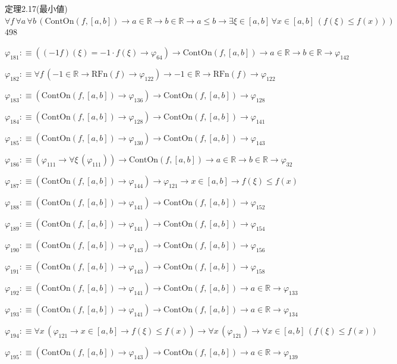 \begin{fullproof}{定理2.17(最小値)}{$\forall f\,\forall a\,\forall b\,(\mathrm{ContOn}(f,[a,b]) \to a \in \mathbb{R} \to b \in \mathbb{R} \to a \leq b \to \exists \xi \in [a,b]\,\forall x \in [a,b]\,(f(\xi) \leq f(x)))$}{498}
\begin{abbrevlist}
\item $\varphi_{181} :\equiv ((-1 f)(\xi) = -1 \cdot f(\xi) \to \varphi_{64}) \to \mathrm{ContOn}(f,[a,b]) \to a \in \mathbb{R} \to b \in \mathbb{R} \to \varphi_{142}$
\item $\varphi_{182} :\equiv \forall f\,(-1 \in \mathbb{R} \to \mathrm{RFn}(f) \to \varphi_{122}) \to -1 \in \mathbb{R} \to \mathrm{RFn}(f) \to \varphi_{122}$
\item $\varphi_{183} :\equiv (\mathrm{ContOn}(f,[a,b]) \to \varphi_{136}) \to \mathrm{ContOn}(f,[a,b]) \to \varphi_{128}$
\item $\varphi_{184} :\equiv (\mathrm{ContOn}(f,[a,b]) \to \varphi_{128}) \to \mathrm{ContOn}(f,[a,b]) \to \varphi_{141}$
\item $\varphi_{185} :\equiv (\mathrm{ContOn}(f,[a,b]) \to \varphi_{130}) \to \mathrm{ContOn}(f,[a,b]) \to \varphi_{143}$
\item $\varphi_{186} :\equiv (\varphi_{111} \to \forall \xi\,(\varphi_{111})) \to \mathrm{ContOn}(f,[a,b]) \to a \in \mathbb{R} \to b \in \mathbb{R} \to \varphi_{32}$
\item $\varphi_{187} :\equiv (\mathrm{ContOn}(f,[a,b]) \to \varphi_{144}) \to \varphi_{121} \to x \in [a,b] \to f(\xi) \leq f(x)$
\item $\varphi_{188} :\equiv (\mathrm{ContOn}(f,[a,b]) \to \varphi_{141}) \to \mathrm{ContOn}(f,[a,b]) \to \varphi_{152}$
\item $\varphi_{189} :\equiv (\mathrm{ContOn}(f,[a,b]) \to \varphi_{141}) \to \mathrm{ContOn}(f,[a,b]) \to \varphi_{154}$
\item $\varphi_{190} :\equiv (\mathrm{ContOn}(f,[a,b]) \to \varphi_{143}) \to \mathrm{ContOn}(f,[a,b]) \to \varphi_{156}$
\item $\varphi_{191} :\equiv (\mathrm{ContOn}(f,[a,b]) \to \varphi_{143}) \to \mathrm{ContOn}(f,[a,b]) \to \varphi_{158}$
\item $\varphi_{192} :\equiv (\mathrm{ContOn}(f,[a,b]) \to \varphi_{141}) \to \mathrm{ContOn}(f,[a,b]) \to a \in \mathbb{R} \to \varphi_{133}$
\item $\varphi_{193} :\equiv (\mathrm{ContOn}(f,[a,b]) \to \varphi_{141}) \to \mathrm{ContOn}(f,[a,b]) \to a \in \mathbb{R} \to \varphi_{134}$
\item $\varphi_{194} :\equiv \forall x\,(\varphi_{121} \to x \in [a,b] \to f(\xi) \leq f(x)) \to \forall x\,(\varphi_{121}) \to \forall x \in [a,b]\,(f(\xi) \leq f(x))$
\item $\varphi_{195} :\equiv (\mathrm{ContOn}(f,[a,b]) \to \varphi_{143}) \to \mathrm{ContOn}(f,[a,b]) \to a \in \mathbb{R} \to \varphi_{139}$

\end{abbrevlist}
\end{fullproof}
